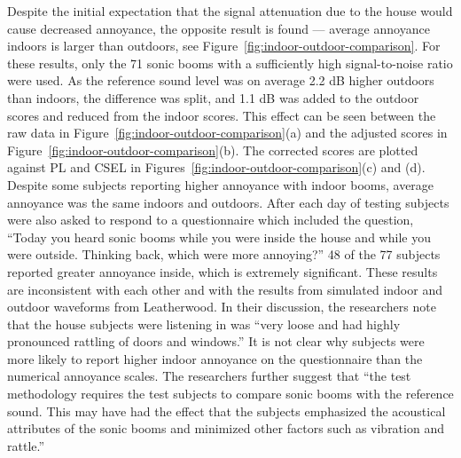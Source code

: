 \documentclass[]{aiaa-tc}%
\begin{document}
Despite the initial expectation that the signal attenuation due to the house would cause decreased annoyance, the opposite result is found --- average annoyance indoors is larger than outdoors, see Figure~\ref{fig:indoor-outdoor-comparison}. For these results, only the 71 sonic booms with a sufficiently high signal-to-noise ratio were used. As the reference sound level was on average 2.2 dB higher outdoors than indoors, the difference was split, and 1.1 dB was added to the outdoor scores and reduced from the indoor scores. This effect can be seen between the raw data in Figure~\ref{fig:indoor-outdoor-comparison}(a) and the adjusted scores in Figure~\ref{fig:indoor-outdoor-comparison}(b). The corrected scores are plotted against PL and CSEL in Figures~\ref{fig:indoor-outdoor-comparison}(c) and (d). Despite some subjects reporting higher annoyance with indoor booms, average annoyance was the same indoors and outdoors. After each day of testing subjects were also asked to respond to a questionnaire which included the question, ``Today you heard sonic booms while you were inside the house and while you were outside. Thinking back, which were more annoying?'' 48 of the 77 subjects reported greater annoyance inside, which is extremely significant. These results are inconsistent with each other and with the results from simulated indoor and outdoor waveforms from Leatherwood. In their discussion, the researchers note that the house subjects were listening in was ``very loose and had highly pronounced rattling of doors and windows.'' It is not clear why subjects were more likely to report higher indoor annoyance on the questionnaire than the numerical annoyance scales. The researchers further suggest that ``the test methodology requires the test subjects to compare sonic booms with the reference sound. This may have had the effect that the subjects emphasized the acoustical attributes of the sonic booms and minimized other factors such as vibration and rattle.''
\end{document}
